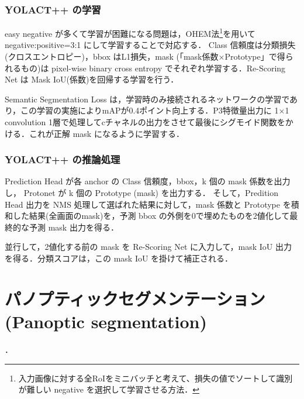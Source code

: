 \documentclass[originalpaper]{jsaiart}     %
\begin{document}
\subsubsection{YOLACT++ の学習}
easy negative が多くて学習が困難になる問題は，OHEM法\footnote[3]{入力画像に対する全RoIをミニバッチと考えて、損失の値でソートして識別が難しい negative を選択して学習させる方法．}を用いて negative:positive=3:1 にして学習することで対応する．
Class 信頼度は分類損失(クロスエントロピー)，bbox はL1損失，mask (「mask係数×Prototype」で得られるもの)は pixel-wise binary cross entropy でそれぞれ学習する．Re-Scoring Net は Mask IoU(係数)を回帰する学習を行う．

Semantic Segmentation Loss は，学習時のみ接続されるネットワークの学習であり，この学習の実施によりmAPが0.4ポイント向上する．P3特徴量出力に 1×1 convolution 1層で処理してcチャネルの出力をさせて最後にシグモイド関数をかける．これが正解 mask になるように学習する．

\subsubsection{YOLACT++ の推論処理}
Prediction Head が各 anchor の Class 信頼度，bbox，k 個の mask 係数を出力し，
Protonet が k 個の Prototype (mask) を出力する．
そして，Predition Head 出力を NMS 処理して選ばれた結果に対して，mask 係数と Prototype を積和した結果(全画面のmask)を，予測 bbox の外側を0で埋めたものを2値化して最終的な予測 mask 出力を得る．

並行して，2値化する前の mask を Re-Scoring Net に入力して，mask IoU 出力を得る．分類スコアは，この mask IoU を掛けて補正される．
\section{パノプティックセグメンテーション(Panoptic segmentation)}
\cite{KHGRD19}．
\end{document}

